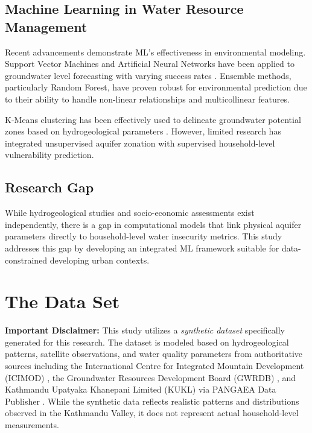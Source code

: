 \documentclass[conference]{IEEEtran}
\begin{document}
\subsection{Machine Learning in Water Resource Management}
Recent advancements demonstrate ML's effectiveness in environmental modeling. Support Vector Machines and Artificial Neural Networks have been applied to groundwater level forecasting with varying success rates \cite{example_ml_hydro}. Ensemble methods, particularly Random Forest, have proven robust for environmental prediction due to their ability to handle non-linear relationships and multicollinear features.

K-Means clustering has been effectively used to delineate groundwater potential zones based on hydrogeological parameters \cite{example_clustering}. However, limited research has integrated unsupervised aquifer zonation with supervised household-level vulnerability prediction.

\subsection{Research Gap}
While hydrogeological studies and socio-economic assessments exist independently, there is a gap in computational models that link physical aquifer parameters directly to household-level water insecurity metrics. This study addresses this gap by developing an integrated ML framework suitable for data-constrained developing urban contexts.

\section{The Data Set}

\textbf{Important Disclaimer:} This study utilizes a \textit{synthetic dataset} specifically generated for this research. The dataset is modeled based on hydrogeological patterns, satellite observations, and water quality parameters from authoritative sources including the International Centre for Integrated Mountain Development (ICIMOD) \cite{icimod}, the Groundwater Resources Development Board (GWRDB) \cite{gwrdb}, and Kathmandu Upatyaka Khanepani Limited (KUKL) via PANGAEA Data Publisher \cite{kathmandu_gw}. While the synthetic data reflects realistic patterns and distributions observed in the Kathmandu Valley, it does not represent actual household-level measurements.
\end{document}
